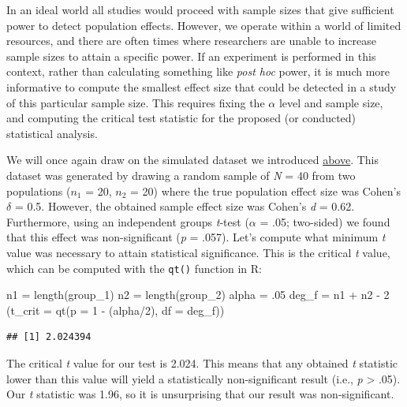\documentclass[
]{book}
\newenvironment{Shaded}{\begin{snugshade}}{\end{snugshade}}
\newcommand{\AttributeTok}[1]{\textcolor[rgb]{0.77,0.63,0.00}{#1}}
\newcommand{\DecValTok}[1]{\textcolor[rgb]{0.00,0.00,0.81}{#1}}
\newcommand{\FunctionTok}[1]{\textcolor[rgb]{0.00,0.00,0.00}{#1}}
\newcommand{\NormalTok}[1]{#1}
\newcommand{\OtherTok}[1]{\textcolor[rgb]{0.56,0.35,0.01}{#1}}
\newcommand{\SpecialCharTok}[1]{\textcolor[rgb]{0.00,0.00,0.00}{#1}}
\begin{document}
In an ideal world all studies would proceed with sample sizes that give sufficient power to detect population effects. However, we operate within a world of limited resources, and there are often times where researchers are unable to increase sample sizes to attain a specific power. If an experiment is performed in this context, rather than calculating something like \emph{post hoc} power, it is much more informative to compute the smallest effect size that could be detected in a study of this particular sample size. This requires fixing the \(\alpha\) level and sample size, and computing the critical test statistic for the proposed (or conducted) statistical analysis.

We will once again draw on the simulated dataset we introduced \protect\hyperlink{samp_vs_pop}{above}. This dataset was generated by drawing a random sample of \emph{N} = 40 from two populations (\(n_1\) = 20, \(n_2\) = 20) where the true population effect size was Cohen's \(\delta\) = 0.5. However, the obtained sample effect size was Cohen's \emph{d} = 0.62. Furthermore, using an independent groups \emph{t}-test (\(\alpha\) = .05; two-sided) we found that this effect was non-significant (\emph{p} = .057). Let's compute what minimum \emph{t} value was necessary to attain statistical significance. This is the critical \emph{t} value, which can be computed with the \texttt{qt()} function in R:

\begin{Shaded}
\begin{Highlighting}[]
\NormalTok{n1 }\OtherTok{=} \FunctionTok{length}\NormalTok{(group\_1)}
\NormalTok{n2 }\OtherTok{=} \FunctionTok{length}\NormalTok{(group\_2)}
\NormalTok{alpha }\OtherTok{=}\NormalTok{ .}\DecValTok{05}
\NormalTok{deg\_f }\OtherTok{=}\NormalTok{ n1 }\SpecialCharTok{+}\NormalTok{ n2 }\SpecialCharTok{{-}} \DecValTok{2}
\NormalTok{(}\AttributeTok{t\_crit =} \FunctionTok{qt}\NormalTok{(}\AttributeTok{p =} \DecValTok{1} \SpecialCharTok{{-}}\NormalTok{ (alpha}\SpecialCharTok{/}\DecValTok{2}\NormalTok{), }\AttributeTok{df =}\NormalTok{ deg\_f))}
\end{Highlighting}
\end{Shaded}

\begin{verbatim}
## [1] 2.024394
\end{verbatim}

The critical \emph{t} value for our test is 2.024. This means that any obtained \emph{t} statistic lower than this value will yield a statistically non-significant result (i.e., \emph{p} \textgreater{} .05). Our \emph{t} statistic was 1.96, so it is unsurprising that our result was non-significant.
\end{document}
